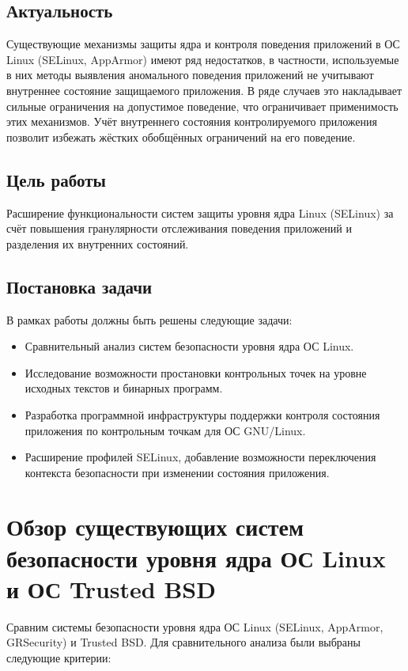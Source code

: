 \subsection{Актуальность} 
Существующие механизмы защиты ядра и 
контроля поведения приложений в ОС Linux 
(SELinux, AppArmor) имеют ряд недостатков, 
в частности, используемые в них методы 
выявления аномального поведения приложений 
не учитывают внутреннее состояние защищаемого 
приложения. В ряде случаев это накладывает 
сильные ограничения на допустимое поведение, 
что ограничивает применимость этих механизмов. 
Учёт внутреннего состояния контролируемого 
приложения позволит избежать жёстких обобщённых 
ограничений на его поведение.

\subsection{Цель работы} 
Расширение функциональности систем защиты 
уровня ядра Linux (SELinux) за счёт повышения 
гранулярности отслеживания поведения приложений 
и разделения их внутренних состояний.

\subsection{Постановка задачи}
В рамках работы должны быть решены следующие задачи:
\begin{itemize}
\item Сравнительный анализ систем безопасности 
	уровня ядра ОС Linux.
\item Исследование возможности 
	простановки контрольных точек на уровне 
	исходных текстов и бинарных программ.
\item Разработка программной инфраструктуры 
	поддержки контроля состояния приложения 
	по контрольным точкам для ОС GNU/Linux.
\item Расширение профилей SELinux, добавление 
	возможности переключения контекста безопасности 
	при изменении состояния приложения.
\end{itemize}
\bigskip

\section{Обзор существующих систем безопасности уровня ядра ОС Linux и ОС Trusted BSD}

\bigskip
Сравним системы безопасности уровня ядра ОС Linux
(SELinux, AppArmor, GRSecurity) и Trusted BSD. 
Для сравнительного анализа были выбраны следующие 
критерии:
 
